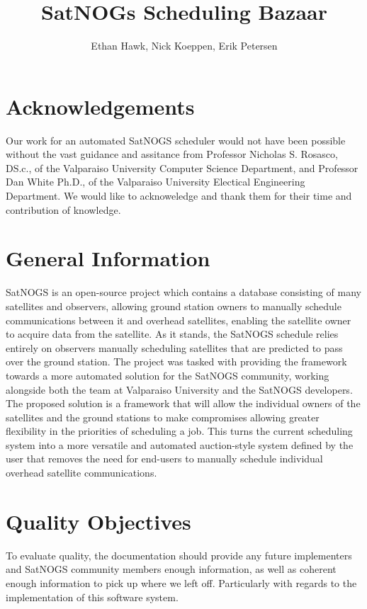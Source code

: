 \documentclass{article}
\author{Ethan Hawk, Nick Koeppen, Erik Petersen}
\title{SatNOGs Scheduling Bazaar}
\begin{document}
\maketitle
\tableofcontents

\section{Acknowledgements}
Our work for an automated SatNOGS scheduler would not have been possible without the vast guidance and assitance from Professor Nicholas S. Rosasco, DS.c., of the Valparaiso University Computer Science Department, and Professor Dan White Ph.D., of the Valparaiso University Electical Engineering Department. We would like to acknoweledge and thank them for their time and contribution of knowledge.


\section{General Information}

SatNOGS is an open-source project which contains a database consisting of many
satellites and observers, allowing ground station owners to manually schedule
communications between it and overhead satellites, enabling the satellite owner
to acquire data from the satellite. As it stands, the SatNOGS schedule relies
entirely on observers manually scheduling satellites that are predicted to pass
over the ground station. The project was tasked with providing the framework
towards a more automated solution for the SatNOGS community, working alongside
both the team at Valparaiso University and the SatNOGS developers. The proposed
solution is a framework that will allow the individual owners of the satellites
and the ground stations to make compromises allowing greater flexibility in the
priorities of scheduling a job. This turns the current scheduling system into a
more versatile and automated auction-style system defined by the user that
removes the need for end-users to manually schedule individual overhead
satellite communications.

\section{Quality Objectives}

To evaluate quality, the documentation should provide any future implementers
and SatNOGS community members enough information, as well as coherent enough
information to pick up where we left off. Particularly with regards to the
implementation of this software system.
\end{document}
